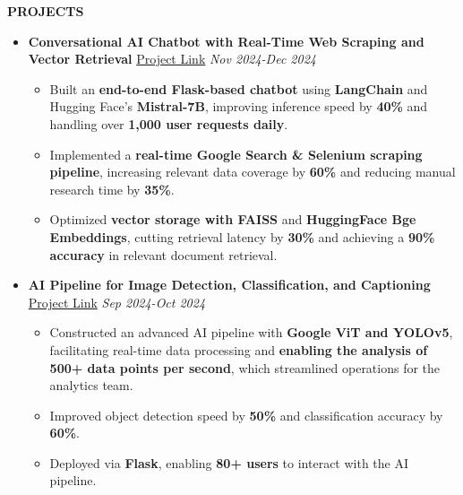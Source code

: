 \documentclass[a4paper,10pt]{article}
\newcommand{\resheading}[1]{%
  \par\noindent%
  \small%
  \colorbox{mygrey}{%
    \parbox{\dimexpr\linewidth-2\fboxsep\relax}{%
      \textbf{#1}%
    }%
  }%
  \par\nobreak%
}
\begin{document}
\resheading{\textbf{PROJECTS} }

\begin{itemize}

\vspace{-0.5mm}
\item {\bf Conversational AI Chatbot with Real-Time Web Scraping and Vector Retrieval}  
\href{https://github.com/kaushik1064/Conversational-AI-Chatbot}{Project Link}  
\textit{\hfill {Nov 2024-Dec 2024}}

\begin{itemize}

\vspace{-2mm}
\item Built an \textbf{end-to-end Flask-based chatbot} using \textbf{LangChain} and Hugging Face’s \textbf{Mistral-7B}, improving inference speed by \textbf{40\%} and handling over \textbf{1,000 user requests daily}.  
\item Implemented a \textbf{real-time Google Search \& Selenium scraping pipeline}, increasing relevant data coverage by \textbf{60\%} and reducing manual research time by \textbf{35\%}.  
\item Optimized \textbf{vector storage with FAISS} and \textbf{HuggingFace Bge Embeddings}, cutting retrieval latency by \textbf{30\%} and achieving a \textbf{90\% accuracy} in relevant document retrieval.  

\vspace{-2mm}
\end{itemize}
\end{itemize}

\begin{itemize}

\vspace{-0.5mm}
\item {\bf AI Pipeline for Image Detection, Classification, and Captioning}  
\href{https://github.com/kaushik1064/INFLIECT_AI_PIPELINE-PROJECT.git}{Project Link}  
\textit{\hfill {Sep 2024-Oct 2024}}

\begin{itemize}

\vspace{-2mm}
\item Constructed an advanced AI pipeline with \textbf{Google ViT and YOLOv5}, facilitating real-time data processing and \textbf{enabling the analysis of 500+ data points per second}, which streamlined operations for the analytics team.  
\item Improved object detection speed by \textbf{50\%} and classification accuracy by \textbf{60\%}.  
\item Deployed via \textbf{Flask}, enabling \textbf{80+ users} to interact with the AI pipeline.  

\vspace{-2mm}
\end{itemize}
\end{itemize}
\end{document}

